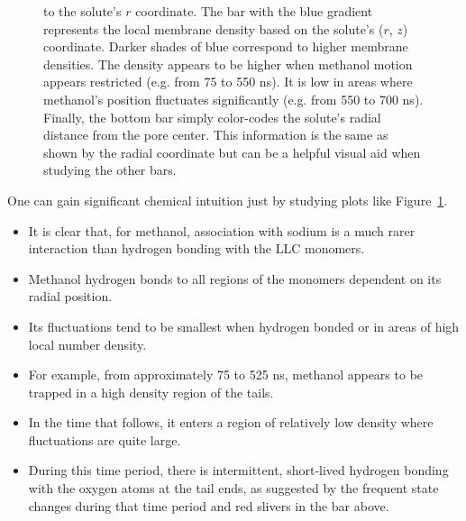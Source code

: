 \documentclass{article}
\begin{document}
\begin{figure}
{  to the solute's $r$ coordinate. The bar with the blue gradient represents the local 
  membrane density based on the solute's ($r$, $z$) coordinate. Darker shades of blue
  correspond to higher membrane densities. The density appears to be higher when methanol
  motion appears restricted (e.g. from 75 to 550 ns). It is low in areas where methanol's
  position fluctuates significantly (e.g. from 550 to 700 ns). Finally, the bottom bar
  simply color-codes the solute's radial distance from the pore center. This information
  is the same as shown by the radial coordinate but can be a helpful visual aid when
  studying the other bars.}\label{fig:mechanism_map}
  \end{figure}
  One can gain significant chemical intuition just by studying plots like
  Figure~\ref{fig:mechanism_map}.
  \begin{itemize}
    \item It is clear that, for methanol, association with sodium is a much rarer
    interaction than hydrogen bonding with the LLC monomers.
    \item Methanol hydrogen bonds to all regions of the monomers dependent on
    its radial position.
    \item Its fluctuations tend to be smallest when hydrogen bonded or in areas
    of high local number density. 
    \item For example, from approximately 75 to 525 ns, methanol appears to be trapped
    in a high density region of the tails.
    \item In the time that follows, it enters a region of relatively low density
    where fluctuations are quite large. 
    \item During this time period, there is intermittent, short-lived hydrogen 
    bonding with the oxygen atoms at the tail ends, as suggested by the frequent 
    state changes during that time period and red slivers in the bar above.
  \end{itemize}

  
\end{document}
